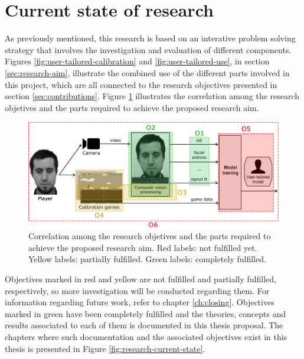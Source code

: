 \section{Current state of research}

As previously mentioned, this research is based on an interative problem solving strategy that involves the investigation and evaluation of different components. Figures \ref{fig:user-tailored-calibration} and \ref{fig:user-tailored-use}, in section \ref{sec:research-aim}, illustrate the combined use of the different parts involved in this project, which are all connected to the research objectives presented in section \ref{sec:contributions}. Figure \ref{fig:components-objectives} illustrates the correlation among the research objetives and the parts required to achieve the proposed research aim.

\begin{figure}[h]
    \centering
    \includegraphics[width=\textwidth]{figures/components-objectives.png}
    \caption{Correlation among the research objetives and the parts required to achieve the proposed research aim. Red labels: not fulfilled yet. Yellow labels: partially fulfilled. Green labels: completely fulfilled.}
    \label{fig:components-objectives}
\end{figure}

Objectives marked in red and yellow are not fulfilled and partially fulfilled, respectively, so more investigation will be conducted regarding them. For information regarding future work, refer to chapter \ref{ch:closing}. Objectives marked in green have been completely fulfilled and the theories, concepts and results associated to each of them is documented in this thesis proposal. The chapters where such documentation and the associated objectives exist in this thesis is presented in Figure \ref{fig:research-current-state}.

